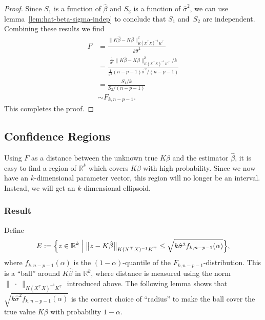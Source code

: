 \documentclass[
  a4paper,
]{article}
\theoremstyle{definition}
\theoremstyle{definition}
\theoremstyle{definition}
\theoremstyle{definition}
\theoremstyle{remark}
\begin{document}
\begin{proof}
Since \(S_1\) is a function of \(\hat\beta\) and \(S_2\) is a function of
\(\hat\sigma^2\), we can use lemma~\ref{lem:hat-beta-sigma-indep} to
conclude that \(S_1\) and~\(S_2\) are independent.
Combining these results we find
\begin{align*}
  F
  &= \frac{\bigl\| K \hat\beta - K \beta \bigr\|_{K(X^\top X)^{-1} K^\top}^2}
          {k \hat\sigma^2} \\
  &= \frac{\frac{1}{\sigma^2} \bigl\| K \hat\beta - K \beta \bigr\|_{K(X^\top X)^{-1} K^\top}^2 / k}
          {\frac{1}{\sigma^2} (n - p - 1) \hat\sigma^2 / (n - p - 1)} \\
  &= \frac{S_1 / k}{S_2 / (n - p - 1)} \\
  &\sim F_{k, n - p - 1}.
\end{align*}
This completes the proof.
\end{proof}

\subsection{Confidence Regions}\label{sec:simult-CI}

Using \(F\) as a distance between the unknown true \(K\beta\) and the estimator
\(\hat\beta\), it is easy to find a region of \(\mathbb{R}^k\) which covers \(K\beta\) with
high probability. Since we now have an \(k\)-dimensional parameter vector, this
region will no longer be an interval. Instead, we will get an \(k\)-dimensional
ellipsoid.

\subsubsection{Result}\label{result}

Define
\begin{equation*}
  E
  := \Bigl\{
      z \in \mathbb{R}^k
    \Bigm|
      \bigl\| z - K \hat\beta \bigr\|_{K(X^\top X)^{-1} K^\top}
        \leq \sqrt{k \hat\sigma^2 f_{k,n-p-1}(\alpha)}
    \Bigr\},
\end{equation*}
where \(f_{k,n-p-1}(\alpha)\) is the \((1-\alpha)\)-quantile of the
\(F_{k,n-p-1}\)-distribution. This is a ``ball'' around \(K\hat\beta\) in \(\mathbb{R}^k\),
where distance is measured using the norm \(\| \;\cdot\; \|_{K(X^\top X)^{-1}
K^\top}\) introduced above. The following lemma shows that \(\sqrt{k \hat\sigma^2
f_{k,n-p-1}(\alpha)}\) is the correct choice of ``radius'' to make the
ball cover the true value \(K\beta\) with probability \(1-\alpha\).
\end{document}
